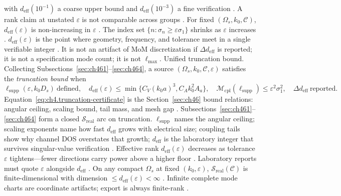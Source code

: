 with \(d_{\mathrm{eff}}(10^{-1})\) a coarse upper bound and \(d_{\mathrm{eff}}(10^{-3})\) a fine verification \cite{hansen1988}.
A rank claim at unstated \(\varepsilon\) is not comparable across groups \cite{stratton1941}.
\label{thm:ch4.deff-monotone-epsilon}
For fixed \((\Omega_{s},k_{0},\mathcal{C})\), \(d_{\mathrm{eff}}(\varepsilon)\) is non-increasing in \(\varepsilon\)
\cite{harrington2001}.
The index set \(\{n:\sigma_{n}\ge\varepsilon\sigma_{1}\}\) shrinks as \(\varepsilon\) increases \cite{harrington2001}.
\(d_{\mathrm{eff}}(\varepsilon)\) is the point where geometry, frequency, and tolerance meet in a single verifiable integer
\cite{stratton1941}. It is not an artifact of MoM discretization if \(\Delta d_{\mathrm{eff}}\) is
reported; it is not a specification mode count; it is not \(\ell_{\max}\). 
Unified truncation bound. Collecting Subsections~\ref{sec:ch461}--\ref{sec:ch464}, a source \((\Omega_{s},k_{0},\mathcal{C},\varepsilon)\) satisfies the
\emph{truncation bound} when
\begin{equation}
\label{eq:ch4.truncation-certificate}
\ell_{\mathrm{supp}}(\varepsilon,k_{0}D_{s})\ \text{defined},\quad
d_{\mathrm{eff}}(\varepsilon)\le\min\{C_{V}(k_{0}a)^{3},C_{A}k_{0}^{2}A_{a}\},\quad
\mathcal{M}_{\mathrm{cpl}}(\ell_{\mathrm{supp}})\le\varepsilon^{2}\sigma_{1}^{2},\quad
\Delta d_{\mathrm{eff}}\ \text{reported}.
\end{equation}
Equation~\eqref{eq:ch4.truncation-certificate} is the Section~\ref{sec:ch46} bound relations: angular ceiling, scaling bound, tail mass, and
mesh gap \cite{hansen1988}.
Subsections~\ref{sec:ch461}--\ref{sec:ch464} form a closed $\mathcal{S}_{\mathrm{real}}$ arc on truncation. \(\ell_{\mathrm{supp}}\) names the angular ceiling;
scaling exponents name how fast \(d_{\mathrm{eff}}\) grows with electrical size; coupling tails show why channel DOS overstates that growth;
\(d_{\mathrm{eff}}\) is the laboratory integer that survives singular-value verification \cite{stratton1941}.
Effective rank $d_{\mathrm{eff}}(\varepsilon)$ decreases as tolerance $\varepsilon$ tightens---fewer directions carry power above a higher floor \cite{harrington2001}. Laboratory reports must quote $\varepsilon$ alongside $d_{\mathrm{eff}}$ \cite{stratton1941}.
\label{cor:ch4.truncation-inevitability}
On any compact \(\Omega_{s}\) at fixed \((k_{0},\varepsilon)\), \(\mathcal{S}_{\mathrm{real}}(\mathcal{C})\) is finite-dimensional with
dimension \(\le d_{\mathrm{eff}}(\varepsilon)<\infty\) \cite{stratton1941}. Infinite complete mode charts are
coordinate artifacts; export is always finite-rank \cite{jackson1999}.
